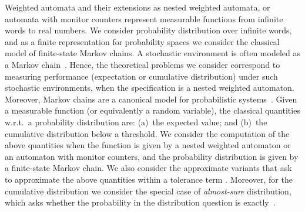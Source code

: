 \documentclass{lmcs}
\begin{document}
\smallskip{}
Weighted automata and their extensions as nested weighted automata, or automata
with monitor counters represent measurable functions from infinite words to
real numbers.
We consider probability distribution over infinite words, and as a finite
representation for probability spaces we consider the classical model of
finite-state Markov chains.
A stochastic environment is often modeled as a Markov chain~\cite{probabilisticMeasuriung}.
Hence, the theoretical problems we consider correspond to measuring performance (expectation or cumulative distribution) under such stochastic environments, when the specification is a nested weighted automaton.
Moreover, Markov chains are a canonical model for probabilistic systems~\cite{PRISM,BaierBook}.
Given a measurable function (or equivalently a random variable), the classical
quantities w.r.t.\ a probability distribution are: (a)~the expected value; and
(b)~the cumulative distribution below a threshold.
We consider the computation of the above quantities when the function is given
by a nested weighted automaton or an automaton with monitor counters, and the
probability distribution is given by a finite-state Markov chain.
We also consider the approximate variants that ask to approximate the above quantities
within a tolerance term .
Moreover, for the cumulative distribution we consider the special case of
\emph{almost-sure} distribution, which asks whether the probability in the distribution question is exactly~.
\end{document}
